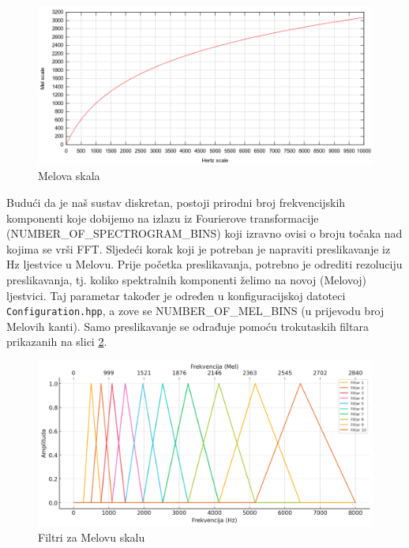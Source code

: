 \begin{figure}[htb]
    \centering
    \includegraphics[width=0.8\linewidth]{Chapters/struktura_sustava/generiranje_znacajki/mel.png} 
    \caption{Melova skala \cite{mel}}
    \label{pic:mel}
\end{figure}

Budući da je naš sustav diskretan, postoji prirodni broj frekvencijskih komponenti koje 
dobijemo na izlazu iz Fourierove transformacije (NUMBER\_OF\_SPECTROGRAM\_BINS) koji
izravno ovisi o broju točaka nad kojima se vrši FFT. Sljedeći korak koji je potreban je
napraviti preslikavanje iz Hz ljestvice u Melovu. Prije početka preslikavanja, potrebno
je odrediti rezoluciju preslikavanja, tj. koliko spektralnih komponenti želimo na 
novoj (Melovoj) ljestvici. Taj parametar također je određen u konfiguracijskoj datoteci
\texttt{Configuration.hpp}, a zove se NUMBER\_OF\_MEL\_BINS (u prijevodu broj Melovih
kanti). Samo preslikavanje se odrađuje pomoću trokutaskih filtara prikazanih na slici 
\ref{pic:melfilter}.

\begin{figure}[htb]
    \centering
    \includegraphics[width=0.8\linewidth]{Chapters/struktura_sustava/generiranje_znacajki/melfiltar.png} 
    \caption{Filtri za Melovu skalu}
    \label{pic:melfilter}
\end{figure}

